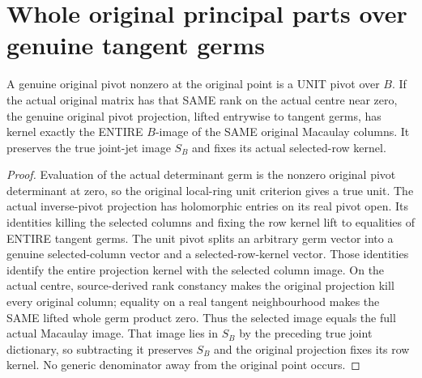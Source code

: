 \section{Whole original principal parts over genuine tangent germs}

\begin{theorem}
\label{hir:actual-centre-whole-germ-pivot-kernel}
A genuine original pivot nonzero at the original point is a UNIT
pivot over $B$. If the actual original matrix has that SAME rank on
the actual centre near zero, the genuine original pivot projection,
lifted entrywise to tangent germs, has kernel exactly the ENTIRE
$B$-image of the SAME original Macaulay columns. It preserves the
true joint-jet image $S_B$ and fixes its actual selected-row kernel.
\leanok
\end{theorem}
\begin{proof}
Evaluation of the actual determinant germ is the nonzero original
pivot determinant at zero, so the original local-ring unit criterion
gives a true unit. The actual inverse-pivot projection has holomorphic
entries on its real pivot open. Its identities killing the selected
columns and fixing the row kernel lift to equalities of ENTIRE tangent
germs. The unit pivot splits an arbitrary germ vector into a genuine
selected-column vector and a selected-row-kernel vector. Those
identities identify the entire projection kernel with the selected
column image. On the actual centre, source-derived rank constancy
makes the original projection kill every original column; equality on
a real tangent neighbourhood makes the SAME lifted whole germ product
zero. Thus the selected image equals the full actual Macaulay image.
That image lies in $S_B$ by the preceding true joint dictionary, so
subtracting it preserves $S_B$ and the original projection fixes its
row kernel. No generic denominator away from the original point occurs.
\end{proof}

